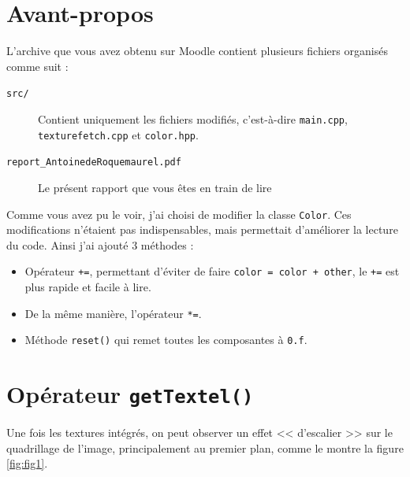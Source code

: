 \documentclass[a4paper, 11pt]{article}
\begin{document}
	\maketitle
	\section{Avant-propos}
	L'archive que vous avez obtenu sur Moodle contient plusieurs fichiers organisés comme suit : 
	\begin{description}
		\item[\texttt{src/}] Contient uniquement les fichiers modifiés, c'est-à-dire \texttt{main.cpp}, \texttt{texturefetch.cpp} et \texttt{color.hpp}.
		\item[\texttt{report\_AntoinedeRoquemaurel.pdf}] Le présent rapport que vous êtes en train de lire
	\end{description}

	Comme vous avez pu le voir, j'ai choisi de modifier la classe \texttt{Color}. Ces modifications n'étaient pas indispensables, mais permettait d'améliorer la
	lecture du code. Ainsi j'ai ajouté 3 méthodes : 
	\begin{itemize}
		\item Opérateur \texttt{+=}, permettant d'éviter de faire \texttt{color = color + other}, le \texttt{+=} est plus rapide et facile à lire.
		\item De la même manière, l'opérateur \texttt{*=}.
		\item Méthode \texttt{reset()} qui remet toutes les composantes à \texttt{0.f}.
	\end{itemize}

	\section{Opérateur \texttt{getTextel()}}
	Une fois les textures intégrés, on peut observer un effet << d'escalier >> sur le quadrillage de l'image, principalement au premier plan, comme le montre la
	figure \ref{fig:fig1}. 
\end{document}
